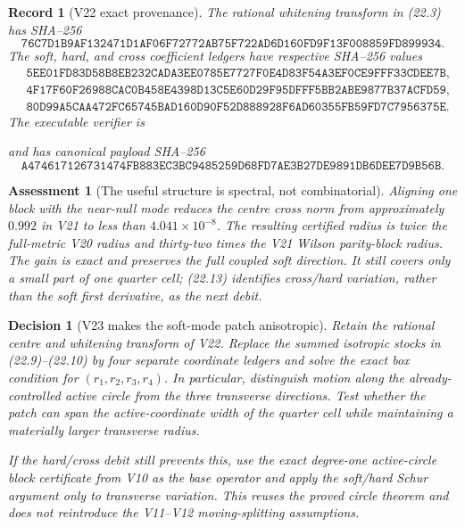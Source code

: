 \documentclass[11pt,oneside]{article}
\newtheorem{assessment}[theorem]{Assessment}
\newtheorem{record}[theorem]{Record}
\newtheorem{decision}[theorem]{Decision}
\theoremstyle{definition}
\theoremstyle{remark}
\begin{document}
\begin{record}[V22 exact provenance]
\label{rec:newv22-provenance}
The rational whitening transform in (22.3) has SHA--256
\[
\texttt{76C7D1B9AF132471D1AF06F72772AB75F722AD6D160FD9F13F008859FD899934}.
                                                               \tag{22.17}
\]
The soft, hard, and cross coefficient ledgers have respective
SHA--256 values
\[
\begin{aligned}
&\texttt{5EE01FD83D58B8EB232CADA3EE0785E7727F0E4D83F54A3EF0CE9FFF33CDEE7B},\\
&\texttt{4F17F60F26988CAC0B458E4398D13C5E60D29F95DFFF5BB2ABE9877B37ACFD59},\\
&\texttt{80D99A5CAA472FC65745BAD160D90F52D888928F6AD60355FB59FD7C7956375E}.
\end{aligned}                                            \tag{22.18}
\]
The executable verifier is
\begin{center}
\footnotesize
{}
\end{center}
and has canonical payload SHA--256
\[
\texttt{A474617126731474FB883EC3BC9485259D68FD7AE3B27DE9891DB6DEE7D9B56B}.
                                                               \tag{22.19}
\]
\end{record}

\begin{assessment}[The useful structure is spectral, not combinatorial]
\label{ass:newv22}
Aligning one block with the near-null mode reduces the centre cross
norm from approximately \(0.992\) in V21 to less than
\(4.041\times10^{-8}\).  The resulting certified radius is twice
the full-metric V20 radius and thirty-two times the V21 Wilson
parity-block radius.  The gain is exact and preserves the full
coupled soft direction.  It still covers only a small part of one
quarter cell; (22.13) identifies cross/hard variation, rather than
the soft first derivative, as the next debit.
\end{assessment}

\begin{decision}[V23 makes the soft-mode patch anisotropic]
\label{dec:newv22-next}
Retain the rational centre and whitening transform of V22.  Replace
the summed isotropic stocks in (22.9)--(22.10) by four separate
coordinate ledgers and solve the exact box condition for
\((r_1,r_2,r_3,r_4)\).  In particular, distinguish motion along the
already-controlled active circle from the three transverse
directions.  Test whether the patch can span the active-coordinate
width of the quarter cell while maintaining a materially larger
transverse radius.

If the hard/cross debit still prevents this, use the exact
degree-one active-circle block certificate from V10 as the base
operator and apply the soft/hard Schur argument only to transverse
variation.  This reuses the proved circle theorem and does not
reintroduce the V11--V12 moving-splitting assumptions.
\end{decision}
\end{document}
